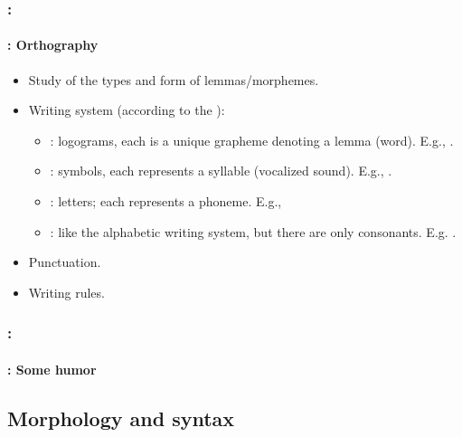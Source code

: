 \documentclass[xcolor=table]{beamer}
\begin{document}
\begin{frame}
	\frametitle{\insertshortsubtitle: \insertsection}
	\framesubtitle{\insertsubsection: Orthography}

	\begin{itemize}
		\item Study of the types and form of lemmas/morphemes.
		\item Writing system (according to the ): 
		\begin{itemize}
			\item {}: logograms, each is a unique grapheme denoting a lemma (word).
			E.g., .
			\item {}: symbols, each represents a syllable (vocalized sound).
			E.g., .
			\item {}: letters; each represents a phoneme.
			E.g., 
			\item {}: like the alphabetic writing system, but there are only consonants. 
			E.g. .
		\end{itemize}
		\item Punctuation.
		\item Writing rules.
	\end{itemize}

\end{frame}

\begin{frame}
	\frametitle{\insertshortsubtitle: \insertsection}
	\framesubtitle{\insertsubsection: Some humor}

	\begin{center}
	\end{center}

\end{frame}

\subsection{Morphology and syntax}
\end{document}
